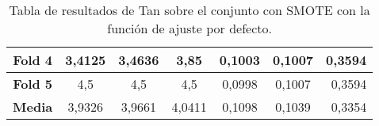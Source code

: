 \begin{table}[H]
{\begin{tabular}{|crrrrrr|}
\multicolumn{1}{|c|}{\textbf{Fold 4}} & \multicolumn{1}{c|}{3,4125}            & \multicolumn{1}{c|}{3,4636}              & \multicolumn{1}{c|}{3,85}            & \multicolumn{1}{c|}{0,1003}            & \multicolumn{1}{c|}{0,1007}              & 0,3594                             \\ \hline
\multicolumn{1}{|c|}{\textbf{Fold 5}} & \multicolumn{1}{c|}{4,5}               & \multicolumn{1}{c|}{4,5}                 & \multicolumn{1}{c|}{4,5}             & \multicolumn{1}{c|}{0,0998}            & \multicolumn{1}{c|}{0,1007}              & 0,3594                             \\ \hline
\multicolumn{1}{|c|}{\textbf{Media}}  & \multicolumn{1}{c|}{3,9326}           & \multicolumn{1}{c|}{3,9661}             & \multicolumn{1}{c|}{4,0411}         & \multicolumn{1}{c|}{0,1098}            & \multicolumn{1}{c|}{0,1039}             & 0,3354                            \\ \hline
\end{tabular}%
}
\caption{Tabla de resultados de Tan sobre el conjunto con SMOTE con la función de ajuste por defecto.}\label{tablaTANconSMOTEdefecto}
\end{table}


